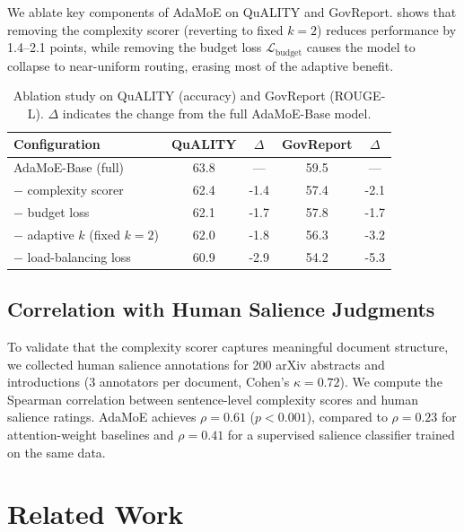 \documentclass[11pt,a4paper]{article}
\newcommand{\loss}{\mathcal{L}}
\begin{document}
We ablate key components of AdaMoE on QuALITY and GovReport.
 shows that removing the complexity scorer (reverting to fixed $k=2$)
reduces performance by 1.4--2.1 points, while removing the budget loss
$\loss_{\text{budget}}$ causes the model to collapse to near-uniform routing, erasing most
of the adaptive benefit.

\begin{table}[t]
\centering
\caption{Ablation study on QuALITY (accuracy) and GovReport (ROUGE-L).
$\Delta$ indicates the change from the full AdaMoE-Base model.}
\label{tab:ablation}
\begin{tabular}{lcccc}
\toprule
\textbf{Configuration} & \textbf{QuALITY} & $\Delta$ & \textbf{GovReport} & $\Delta$ \\
\midrule
AdaMoE-Base (full)              & 63.8 & ---   & 59.5 & ---   \\
\quad $-$ complexity scorer     & 62.4 & -1.4  & 57.4 & -2.1  \\
\quad $-$ budget loss           & 62.1 & -1.7  & 57.8 & -1.7  \\
\quad $-$ adaptive $k$ (fixed $k\!=\!2$) & 62.0 & -1.8 & 56.3 & -3.2 \\
\quad $-$ load-balancing loss   & 60.9 & -2.9  & 54.2 & -5.3  \\
\bottomrule
\end{tabular}
\end{table}

\subsection{Correlation with Human Salience Judgments}

To validate that the complexity scorer captures meaningful document structure, we collected
human salience annotations for 200 arXiv abstracts and introductions (3 annotators per
document, Cohen's $\kappa = 0.72$).
We compute the Spearman correlation between sentence-level complexity scores and human
salience ratings.
AdaMoE achieves $\rho = 0.61$ ($p < 0.001$), compared to $\rho = 0.23$ for attention-weight
baselines and $\rho = 0.41$ for a supervised salience classifier trained on the same data.

\section{Related Work}
\label{sec:related}
\end{document}
